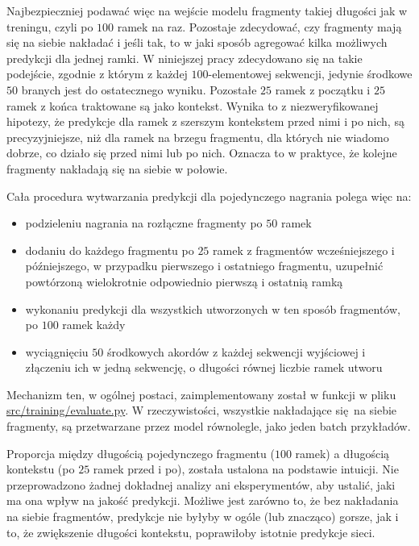 Najbezpieczniej podawać więc na wejście modelu fragmenty takiej długości jak w treningu, czyli po
$100$ ramek na raz. Pozostaje zdecydować, czy fragmenty mają się na siebie nakładać i jeśli tak, to
w jaki sposób agregować kilka możliwych predykcji dla jednej ramki. W niniejszej pracy zdecydowano
się na takie podejście, zgodnie z którym z każdej $100$-elementowej sekwencji, jedynie środkowe $50$
branych jest do ostatecznego wyniku. Pozostałe $25$ ramek z początku i $25$ ramek z końca traktowane
są jako kontekst. Wynika to z niezweryfikowanej hipotezy, że predykcje dla ramek z szerszym
kontekstem przed nimi i po nich, są precyzyjniejsze, niż dla ramek na brzegu fragmentu, dla których
nie wiadomo dobrze, co działo się przed nimi lub po nich. Oznacza to w praktyce, że kolejne
fragmenty nakładają się na siebie w połowie. 

Cała procedura wytwarzania predykcji dla pojedynczego nagrania polega więc na:
\begin{itemize}
    \item podzieleniu nagrania na rozłączne fragmenty po $50$ ramek
    \item dodaniu do każdego fragmentu po $25$ ramek z fragmentów wcześniejszego i późniejszego, w
        przypadku pierwszego i ostatniego fragmentu, uzupełnić powtórzoną wielokrotnie odpowiednio
        pierwszą i ostatnią ramką
    \item wykonaniu predykcji dla wszystkich utworzonych w ten sposób fragmentów, po $100$ ramek
        każdy
    \item wyciągnięciu $50$ środkowych akordów z każdej sekwencji wyjściowej i złączeniu ich w jedną
        sekwencję, o długości równej liczbie ramek utworu
\end{itemize}
Mechanizm ten, w ogólnej postaci, zaimplementowany został w funkcji  w pliku
\url{src/training/evaluate.py}. W rzeczywistości, wszystkie nakładające się na siebie fragmenty, są
przetwarzane przez model równolegle, jako jeden batch przykładów.

Proporcja między długością pojedynczego fragmentu ($100$ ramek) a długością kontekstu (po $25$
ramek przed i po), została ustalona na podstawie intuicji. Nie przeprowadzono żadnej dokładnej
analizy ani eksperymentów, aby ustalić, jaki ma ona wpływ na jakość predykcji. Możliwe jest zarówno
to, że bez nakładania na siebie fragmentów, predykcje nie byłyby w ogóle (lub znacząco) gorsze, jak
i to, że zwiększenie długości kontekstu, poprawiłoby istotnie predykcje sieci.



